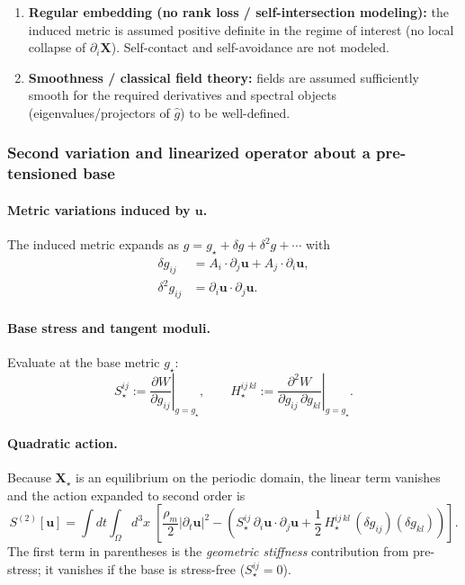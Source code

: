 \begin{enumerate}
  \item \textbf{Regular embedding (no rank loss / self-intersection modeling):}
  the induced metric is assumed positive definite in the regime of interest
  (no local collapse of $\partial_i\mathbf X$). Self-contact and self-avoidance are not modeled.

  \item \textbf{Smoothness / classical field theory:}
  fields are assumed sufficiently smooth for the required derivatives and
  spectral objects (eigenvalues/projectors of $\widehat g$) to be well-defined.
\end{enumerate}

\subsubsection{Second variation and linearized operator about a pre-tensioned base}
\label{sec:second-variation-linearization}

\paragraph{Metric variations induced by $\mathbf u$.}
The induced metric expands as $g=g_\star+\delta g + \delta^2 g + \cdots$ with
\begin{align}
  \delta g_{ij}
  &=
  A_i\cdot\partial_j\mathbf u
  +
  A_j\cdot\partial_i\mathbf u,
  \label{eq:delta-metric}
  \\
  \delta^2 g_{ij}
  &=
  \partial_i\mathbf u\cdot\partial_j\mathbf u.
  \label{eq:delta2-metric}
\end{align}

\paragraph{Base stress and tangent moduli.}
Evaluate at the base metric $g_\star$:
\begin{equation}
  S_\star^{ij}:=\left.\frac{\partial W}{\partial g_{ij}}\right|_{g=g_\star},
  \qquad
  H_\star^{ij\,kl}:=\left.\frac{\partial^2 W}{\partial g_{ij}\,\partial g_{kl}}\right|_{g=g_\star}.
  \label{eq:base-stress-and-moduli}
\end{equation}

\paragraph{Quadratic action.}
Because $\mathbf X_\star$ is an equilibrium on the periodic domain, the linear term vanishes and
the action expanded to second order is
\begin{equation}
  S^{(2)}[\mathbf u]
  =
  \int dt\int_{\Omega} d^3x\;
  \left[
    \frac{\rho_m}{2}|\partial_t\mathbf u|^2
    -
    \left(
      S_\star^{ij}\,\partial_i\mathbf u\cdot\partial_j\mathbf u
      +
      \frac12\,H_\star^{ij\,kl}\,(\delta g_{ij})(\delta g_{kl})
    \right)
  \right].
  \label{eq:quadratic-action}
\end{equation}
The first term in parentheses is the \emph{geometric stiffness} contribution from pre-stress;
it vanishes if the base is stress-free ($S_\star^{ij}=0$).

